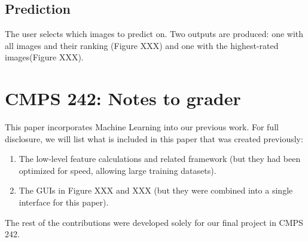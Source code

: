 \documentclass[11pt,letter]{article}
\begin{document}
\subsection{Prediction}
The user selects which images to predict on. Two outputs are produced: one with all images and their ranking (Figure XXX) and one with the highest-rated images(Figure XXX).

\section{CMPS 242: Notes to grader}
This paper incorporates Machine Learning into our previous work. For full disclosure, we will list what is included in this paper that was created previously:

\begin{enumerate}
\item The low-level feature calculations and related framework (but they had been optimized for speed, allowing large training datasets).
\item The GUIs in Figure XXX and XXX (but they were combined into a single interface for this paper).
\end{enumerate}

The rest of the contributions were developed solely for our final project in CMPS 242.



\end{document}

